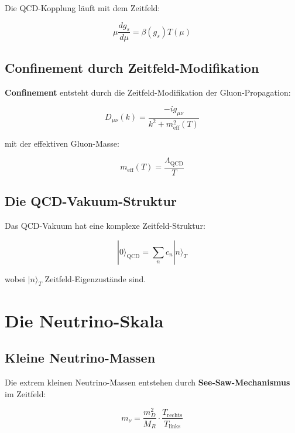 \documentclass[12pt,a4paper]{report}
\begin{document}
	Die QCD-Kopplung läuft mit dem Zeitfeld:
	
	\begin{equation}
		\mu\frac{dg_s}{d\mu} = \beta(g_s)T(\mu)
	\end{equation}
	
	\subsection{Confinement durch Zeitfeld-Modifikation}
	
	\textbf{Confinement} entsteht durch die Zeitfeld-Modifikation der Gluon-Propagation:
	
	\begin{equation}
		D_{\mu\nu}(k) = \frac{-ig_{\mu\nu}}{k^2 + m_{\text{eff}}^2(T)}
	\end{equation}
	
	mit der effektiven Gluon-Masse:
	
	\begin{equation}
		m_{\text{eff}}(T) = \frac{\Lambda_{\text{QCD}}}{T}
	\end{equation}
	
	\subsection{Die QCD-Vakuum-Struktur}
	
	Das QCD-Vakuum hat eine komplexe Zeitfeld-Struktur:
	
	\begin{equation}
		|0\rangle_{\text{QCD}} = \sum_n c_n |n\rangle_T
	\end{equation}
	
	wobei $|n\rangle_T$ Zeitfeld-Eigenzustände sind.
	
	\section{Die Neutrino-Skala}
	
	\subsection{Kleine Neutrino-Massen}
	
	Die extrem kleinen Neutrino-Massen entstehen durch \textbf{See-Saw-Mechanismus} im Zeitfeld:
	
	\begin{equation}
		m_\nu = \frac{m_D^2}{M_R} \cdot \frac{T_{\text{rechts}}}{T_{\text{links}}}
	\end{equation}
	
\end{document}
